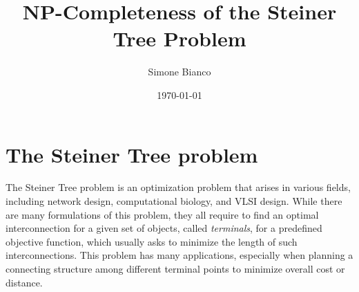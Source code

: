 \documentclass[12pt,a4paper]{article}
\begin{document}
    \title{NP-Completeness of the Steiner Tree Problem}
    \author{Simone Bianco}
    \date{\today}

    \maketitle


    \tableofcontents
    \newpage

    \section{The Steiner Tree problem}

    The Steiner Tree problem is an optimization problem that arises in various fields, including network design, computational biology, and VLSI design. While there are many formulations of this problem, they all require to find an optimal interconnection for a given set of objects, called \textit{terminals}, for a predefined objective function, which usually asks to minimize the length of such interconnections. This problem has many applications, especially when planning a connecting structure among different terminal points to minimize overall cost or distance. \cite{shortest_network}
\end{document}
